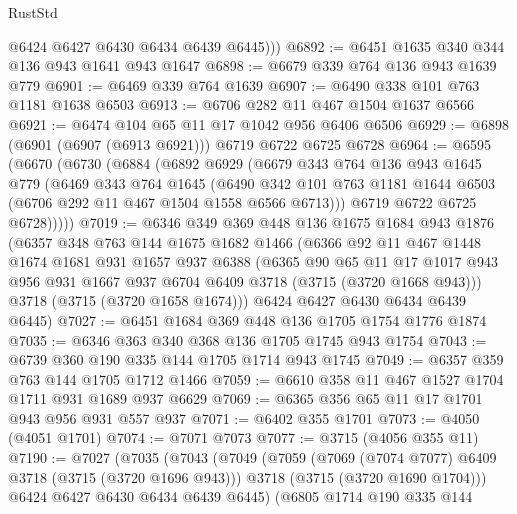 \begin{lexlean}{RustStd}
\begin{coremodule}
          @6424
          @6427
          @6430
          @6434
          @6439
          @6445)))
@6892 := @6451 @1635 @340 @344 @136 @943 @1641 @943 @1647
@6898 := @6679 @339 @764 @136 @943 @1639 @779
@6901 := @6469 @339 @764 @1639
@6907 := @6490 @338 @101 @763 @1181 @1638 @6503
@6913 := @6706 @282 @11 @467 @1504 @1637 @6566
@6921 := @6474 @104 @65 @11 @17 @1042 @956 @6406 @6506
@6929 := @6898 (@6901 (@6907 (@6913 @6921))) @6719 @6722 @6725 @6728
@6964 := @6595
    (@6670
      (@6730
        (@6884
          (@6892
            @6929
            (@6679
              @343
              @764
              @136
              @943
              @1645
              @779
              (@6469
                @343
                @764
                @1645
                (@6490
                  @342
                  @101
                  @763
                  @1181
                  @1644
                  @6503
                  (@6706 @292 @11 @467 @1504 @1558 @6566 @6713)))
              @6719
              @6722
              @6725
              @6728)))))
@7019 := @6346
    @349
    @369
    @448
    @136
    @1675
    @1684
    @943
    @1876
    (@6357
      @348
      @763
      @144
      @1675
      @1682
      @1466
      (@6366
        @92
        @11
        @467
        @1448
        @1674
        @1681
        @931
        @1657
        @937
        @6388
        (@6365
          @90
          @65
          @11
          @17
          @1017
          @943
          @956
          @931
          @1667
          @937
          @6704
          @6409
          @3718
          (@3715 (@3720 @1668 @943)))
        @3718
        (@3715 (@3720 @1658 @1674)))
      @6424
      @6427
      @6430
      @6434
      @6439
      @6445)
@7027 := @6451 @1684 @369 @448 @136 @1705 @1754 @1776 @1874
@7035 := @6346 @363 @340 @368 @136 @1705 @1745 @943 @1754
@7043 := @6739 @360 @190 @335 @144 @1705 @1714 @943 @1745
@7049 := @6357 @359 @763 @144 @1705 @1712 @1466
@7059 := @6610 @358 @11 @467 @1527 @1704 @1711 @931 @1689 @937 @6629
@7069 := @6365 @356 @65 @11 @17 @1701 @943 @956 @931 @557 @937
@7071 := @6402 @355 @1701
@7073 := @4050 (@4051 @1701)
@7074 := @7071 @7073
@7077 := @3715 (@4056 @355 @11)
@7190 := @7027
    (@7035
      (@7043
        (@7049
          (@7059
            (@7069 (@7074 @7077) @6409 @3718 (@3715 (@3720 @1696 @943)))
            @3718
            (@3715 (@3720 @1690 @1704)))
          @6424
          @6427
          @6430
          @6434
          @6439
          @6445)
        (@6805
          @1714
          @190
          @335
          @144

\end{coremodule}
\end{lexlean}
